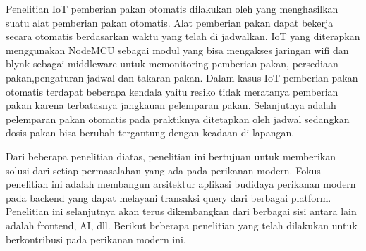 Penelitian IoT pemberian pakan otomatis dilakukan oleh \citep{Setiawan2022IoTSekolahVokasi} yang menghasilkan suatu alat pemberian pakan otomatis. Alat pemberian pakan dapat bekerja secara otomatis berdasarkan waktu yang telah di jadwalkan. IoT yang diterapkan menggunakan NodeMCU sebagai modul yang bisa mengakses jaringan wifi dan blynk sebagai middleware untuk memonitoring pemberian pakan, persediaan pakan,pengaturan jadwal dan takaran pakan. Dalam kasus IoT pemberian pakan otomatis terdapat beberapa kendala yaitu resiko tidak meratanya pemberian pakan karena terbatasnya jangkauan pelemparan pakan. Selanjutnya adalah pelemparan pakan otomatis pada praktiknya ditetapkan oleh jadwal sedangkan dosis pakan bisa berubah tergantung dengan keadaan di lapangan.




Dari beberapa penelitian diatas, penelitian ini bertujuan untuk memberikan solusi dari setiap permasalahan yang ada pada perikanan modern. Fokus penelitian ini adalah membangun arsitektur aplikasi budidaya perikanan modern pada backend yang dapat melayani transaksi query dari berbagai platform. Penelitian ini selanjutnya akan terus dikembangkan dari berbagai sisi antara lain adalah frontend, AI, dll. Berikut beberapa penelitian yang telah dilakukan untuk berkontribusi pada perikanan modern ini.

